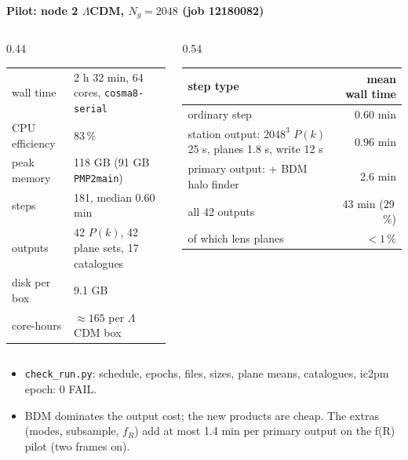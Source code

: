\documentclass[UTF8]{beamer}
\begin{document}
\begin{frame}{\textbf{Pilot: node 2 $\Lambda$CDM, $N_g = 2048$ (job 12180082)}}
  \footnotesize
  \begin{columns}[T]
    \begin{column}{0.44\textwidth}
      \begin{tabular}{@{}lp{}@{}}
        \toprule
        wall time & 2 h 32 min, 64 cores, \texttt{cosma8-serial} \\
        CPU efficiency & 83\,\% \\
        peak memory & 118 GB (91 GB \texttt{PMP2main}) \\
        steps & 181, median 0.60 min \\
        outputs & 42 $P(k)$, 42 plane sets, 17 catalogues \\
        disk per box & 9.1 GB \\
        core-hours & $\approx 165$ per $\Lambda$CDM box \\
        \bottomrule
      \end{tabular}
    \end{column}
    \begin{column}{0.54\textwidth}
      \begin{tabular}{@{}p{}r@{}}
        \toprule
        step type & mean wall time \\
        \midrule
        ordinary step & 0.60 min \\
        station output: $2048^3$ $P(k)$ 25 s, planes 1.8 s, write 12 s & 0.96 min \\
        primary output: + BDM halo finder & 2.6 min \\
        \midrule
        all 42 outputs & 43 min (29\,\%) \\
        of which lens planes & $< 1\,\%$ \\
        \bottomrule
      \end{tabular}
    \end{column}
  \end{columns}
  \medskip
  \small
  \begin{itemize}
    \item \texttt{check\_run.py}: schedule, epochs, files, sizes, plane means, catalogues, ic2pm epoch: 0 FAIL.
    \item BDM dominates the output cost; the new products are cheap. The extras (modes, subsample, $f_R$)
      add at most 1.4 min per primary output on the f(R) pilot (two frames on).
  \end{itemize}
\end{frame}
\end{document}
